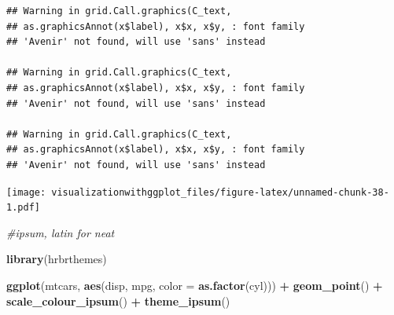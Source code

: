 \documentclass[]{krantz}
\makeatletter
\newenvironment{Shaded}{\begin{snugshade}}{\end{snugshade}}
\newcommand{\CommentTok}[1]{\textcolor[rgb]{0.56,0.35,0.01}{\textit{#1}}}
\newcommand{\DataTypeTok}[1]{\textcolor[rgb]{0.13,0.29,0.53}{#1}}
\newcommand{\KeywordTok}[1]{\textcolor[rgb]{0.13,0.29,0.53}{\textbf{#1}}}
\newcommand{\NormalTok}[1]{#1}
\newcommand{\OperatorTok}[1]{\textcolor[rgb]{0.81,0.36,0.00}{\textbf{#1}}}
\newcommand{\StringTok}[1]{\textcolor[rgb]{0.31,0.60,0.02}{#1}}
\newenvironment{kframe}{%
\medskip{}
\setlength{\fboxsep}{.8em}
 \def\at@end@of@kframe{}%
 \ifinner\ifhmode%
  \def\at@end@of@kframe{\end{minipage}}%
  \begin{minipage}{\columnwidth}%
 \fi\fi%
 \def\FrameCommand##1{\hskip\@totalleftmargin \hskip-\fboxsep
 \colorbox{shadecolor}{##1}\hskip-\fboxsep
     \hskip-\linewidth \hskip-\@totalleftmargin \hskip\columnwidth}%
 \MakeFramed {\advance\hsize-\width
   \@totalleftmargin\z@ \linewidth\hsize
   \@setminipage}}%
 {\par\unskip\endMakeFramed%
 \at@end@of@kframe}
\renewenvironment{Shaded}{\begin{kframe}}{\end{kframe}}
\makeatother
\begin{document}
\begin{verbatim}
## Warning in grid.Call.graphics(C_text,
## as.graphicsAnnot(x$label), x$x, x$y, : font family
## 'Avenir' not found, will use 'sans' instead

## Warning in grid.Call.graphics(C_text,
## as.graphicsAnnot(x$label), x$x, x$y, : font family
## 'Avenir' not found, will use 'sans' instead

## Warning in grid.Call.graphics(C_text,
## as.graphicsAnnot(x$label), x$x, x$y, : font family
## 'Avenir' not found, will use 'sans' instead
\end{verbatim}

\texttt{[image: visualizationwithggplot\_files/figure-latex/unnamed-chunk-38-1.pdf]}

\begin{Shaded}
\begin{Highlighting}[]
\CommentTok{#ipsum, latin for neat}

\KeywordTok{library}\NormalTok{(hrbrthemes)}

\KeywordTok{ggplot}\NormalTok{(mtcars, }\KeywordTok{aes}\NormalTok{(disp, mpg, }\DataTypeTok{color =} \KeywordTok{as.factor}\NormalTok{(cyl))) }\OperatorTok{+}\StringTok{ }
\StringTok{  }\KeywordTok{geom_point}\NormalTok{() }\OperatorTok{+}\StringTok{    }
\StringTok{  }\KeywordTok{scale_colour_ipsum}\NormalTok{() }\OperatorTok{+}\StringTok{ }
\StringTok{    }\KeywordTok{theme_ipsum}\NormalTok{()}
\end{Highlighting}
\end{Shaded}
\end{document}
